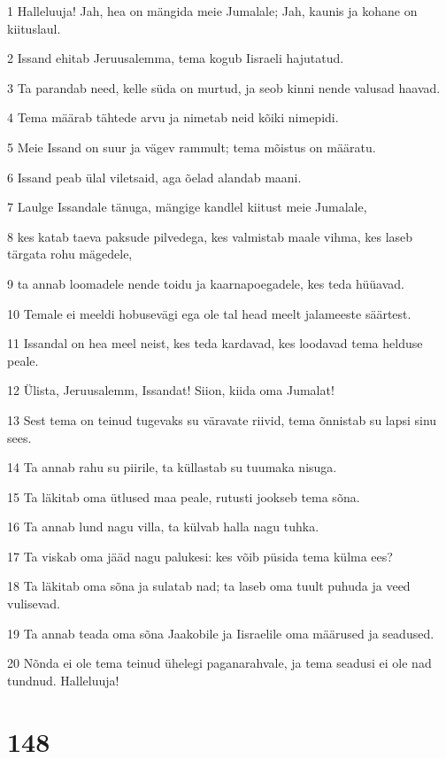 \par 1 Halleluuja! Jah, hea on mängida meie Jumalale; Jah, kaunis ja kohane on kiituslaul.
\par 2 Issand ehitab Jeruusalemma, tema kogub Iisraeli hajutatud.
\par 3 Ta parandab need, kelle süda on murtud, ja seob kinni nende valusad haavad.
\par 4 Tema määrab tähtede arvu ja nimetab neid kõiki nimepidi.
\par 5 Meie Issand on suur ja vägev rammult; tema mõistus on määratu.
\par 6 Issand peab ülal viletsaid, aga õelad alandab maani.
\par 7 Laulge Issandale tänuga, mängige kandlel kiitust meie Jumalale,
\par 8 kes katab taeva paksude pilvedega, kes valmistab maale vihma, kes laseb tärgata rohu mägedele,
\par 9 ta annab loomadele nende toidu ja kaarnapoegadele, kes teda hüüavad.
\par 10 Temale ei meeldi hobusevägi ega ole tal head meelt jalameeste säärtest.
\par 11 Issandal on hea meel neist, kes teda kardavad, kes loodavad tema helduse peale.
\par 12 Ülista, Jeruusalemm, Issandat! Siion, kiida oma Jumalat!
\par 13 Sest tema on teinud tugevaks su väravate riivid, tema õnnistab su lapsi sinu sees.
\par 14 Ta annab rahu su piirile, ta küllastab su tuumaka nisuga.
\par 15 Ta läkitab oma ütlused maa peale, rutusti jookseb tema sõna.
\par 16 Ta annab lund nagu villa, ta külvab halla nagu tuhka.
\par 17 Ta viskab oma jääd nagu palukesi: kes võib püsida tema külma ees?
\par 18 Ta läkitab oma sõna ja sulatab nad; ta laseb oma tuult puhuda ja veed vulisevad.
\par 19 Ta annab teada oma sõna Jaakobile ja Iisraelile oma määrused ja seadused.
\par 20 Nõnda ei ole tema teinud ühelegi paganarahvale, ja tema seadusi ei ole nad tundnud. Halleluuja!

\chapter{148}

